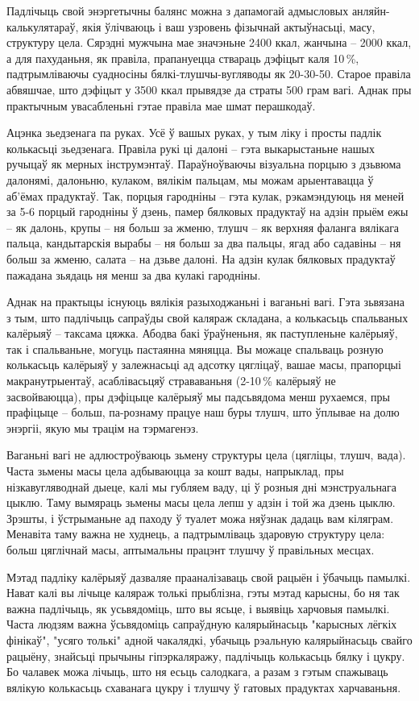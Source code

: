 Падлічыць свой энэргетычны балянс можна з дапамогай адмысловых анляйн-калькулятараў, якія ўлічваюць і ваш узровень фізычнай актыўнасьці, масу, структуру цела. Сярэдні мужчына мае значэньне 2400 ккал, жанчына – 2000 ккал, а для пахуданьня, як правіла, прапануецца ствараць дэфіцыт каля 10\,\%, падтрымліваючы суадносіны бялкі-тлушчы-вугляводы як 20-30-50. Старое правіла абвяшчае, што дэфіцыт у 3500 ккал прывядзе да страты 500 грам вагі. Аднак пры практычным увасабленьні гэтае правіла мае шмат перашкодаў.

Ацэнка зьедзенага па руках. Усё ў вашых руках, у тым ліку і просты падлік колькасьці зьедзенага. Правіла рукі ці далоні – гэта выкарыстаньне нашых ручыцаў як мерных інструмэнтаў. Параўноўваючы візуальна порцыю з дзьвюма далонямі, далоньню, кулаком, вялікім пальцам, мы можам арыентавацца ў аб'ёмах прадуктаў. Так, порцыя гародніны – гэта кулак, рэкамэндуюць ня меней за 5-6 порцый гародніны ў дзень, памер бялковых прадуктаў на адзін прыём ежы – як далонь, крупы – ня больш за жменю, тлушч – як верхняя фаланга вялікага пальца, кандытарскія вырабы – ня больш за два пальцы, ягад або садавіны – ня больш за жменю, салата – на дзьве далоні. На адзін кулак бялковых прадуктаў пажадана зьядаць ня менш за два кулакі гародніны.

Аднак на практыцы існуюць вялікія разыходжаньні і ваганьні вагі. Гэта зьвязана з тым, што падлічыць сапраўды свой каляраж складана, а колькасьць спальваных калёрыяў – таксама цяжка. Абодва бакі ўраўненьня, як паступленьне калёрыяў, так і спальваньне, могуць пастаянна мяняцца. Вы можаце спальваць розную колькасьць калёрыяў у залежнасьці ад адсотку цягліцаў, вашае масы, прапорцыі макранутрыентаў, асаблівасьцяў страваваньня (2-10\,\% калёрыяў не засвойваюцца), пры дэфіцыце калёрыяў мы падсьвядома менш рухаемся, пры прафіцыце – больш, па-рознаму працуе наш буры тлушч, што ўплывае на долю энэргіі, якую мы трацім на тэрмагенэз.

Ваганьні вагі не адлюстроўваюць зьмену структуры цела (цягліцы, тлушч, вада). Часта зьмены масы цела адбываюцца за кошт вады, напрыклад, пры нізкавугляводнай дыеце, калі мы губляем ваду, ці ў розныя дні мэнструальнага цыклю. Таму вымяраць зьмены масы цела лепш у адзін і той жа дзень цыклю. Зрэшты, і ўстрыманьне ад паходу ў туалет можа няўзнак дадаць вам кіляграм. Менавіта таму важна не худнець, а падтрымліваць здаровую структуру цела: больш цяглічнай масы, аптымальны працэнт тлушчу ў правільных месцах.

Мэтад падліку калёрыяў дазваляе прааналізаваць свой рацыён і ўбачыць памылкі. Нават калі вы лічыце каляраж толькі прыблізна, гэты мэтад карысны, бо ня так важна падлічыць, як усьвядоміць, што вы ясьце, і выявіць харчовыя памылкі. Часта людзям важна ўсьвядоміць сапраўдную калярыйнасьць "карысных лёгкіх фінікаў", "усяго толькі" адной чакалядкі, убачыць рэальную калярыйнасьць свайго рацыёну, знайсьці прычыны гіпэркаляражу, падлічыць колькасьць бялку і цукру. Бо чалавек можа лічыць, што ня есьць салодкага, а разам з гэтым спажываць вялікую колькасьць схаванага цукру і тлушчу ў гатовых прадуктах харчаваньня.

